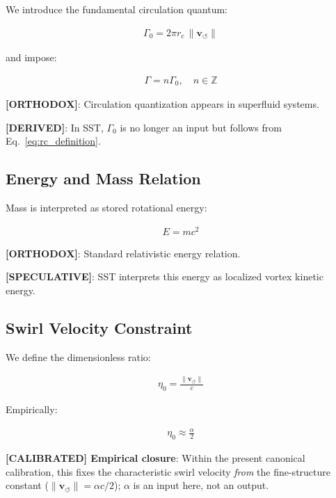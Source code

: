 \documentclass[11pt]{article}
\theoremstyle{definition}
\theoremstyle{plain}
\theoremstyle{remark}
\newcommand{\rc}{{r_c}}
\newcommand{\vnorm}{\lVert \mathbf{v}_{\!\boldsymbol{\circlearrowleft}} \rVert}
\begin{document}
        We introduce the fundamental circulation quantum:
        
        \begin{align}
            \Gamma_0 = 2\pi \rc \, \vnorm
            \label{eq:gamma0}
        \end{align}
        
        and impose:
        
        \begin{align}
            \Gamma = n \Gamma_0, \quad n \in \mathbb{Z}
        \end{align}
        
        \textbf{[ORTHODOX]}: Circulation quantization appears in superfluid systems.
        
        \textbf{[DERIVED]}: In SST, $\Gamma_0$ is no longer an input but follows from Eq.~\ref{eq:rc_definition}.
    
    \subsection{Energy and Mass Relation}
        
        Mass is interpreted as stored rotational energy:
        
        \begin{align}
            E = m c^2
        \end{align}
        
        \textbf{[ORTHODOX]}: Standard relativistic energy relation.
        
        \textbf{[SPECULATIVE]}: SST interprets this energy as localized vortex kinetic energy.
    
    \subsection{Swirl Velocity Constraint}
        
        We define the dimensionless ratio:
        
        \begin{align}
            \eta_0 = \frac{\vnorm}{c}
        \end{align}
        
        Empirically:
        
        \begin{align}
            \eta_0 \approx \frac{\alpha}{2}
        \end{align}
        
        \textbf{[CALIBRATED] Empirical closure}: Within the present canonical calibration, this fixes the characteristic swirl velocity \emph{from} the fine-structure constant ($\vnorm=\alpha c/2$); $\alpha$ is an input here, not an output.
\end{document}
